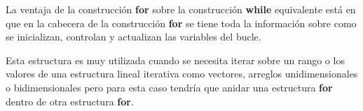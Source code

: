 La ventaja de la construcción \textbf{for} sobre la
construcción \textbf{while} equivalente está en que en la cabecera de la construcción \textbf{for} se tiene toda
la información sobre como se inicializan, controlan y actualizan las variables del bucle.

Esta estructura es muy utilizada cuando se necesita iterar sobre un rango o los valores de una estructura lineal iterativa como vectores, arreglos unidimensionales o bidimensionales pero para esta caso tendría que anidar una estructura \textbf{for} dentro de otra estructura \textbf{for}.